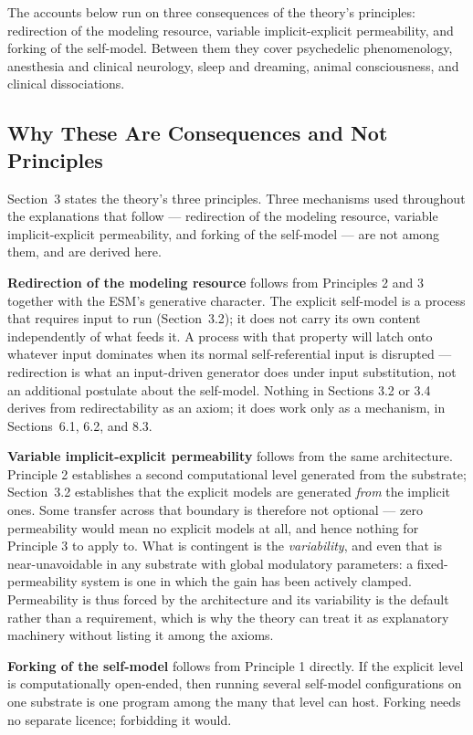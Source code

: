 \documentclass[12pt]{article}
\begin{document}
The accounts below run on three consequences of the theory's principles: redirection of the modeling resource, variable implicit-explicit permeability, and forking of the self-model. Between them they cover psychedelic phenomenology, anesthesia and clinical neurology, sleep and dreaming, animal consciousness, and clinical dissociations.

\subsection*{Why These Are Consequences and Not Principles}

Section~3 states the theory's three principles. Three mechanisms used throughout the explanations that follow --- redirection of the modeling resource, variable implicit-explicit permeability, and forking of the self-model --- are not among them, and are derived here.

\textbf{Redirection of the modeling resource} follows from Principles 2 and 3 together with the ESM's generative character. The explicit self-model is a process that requires input to run (Section~3.2); it does not carry its own content independently of what feeds it. A process with that property will latch onto whatever input dominates when its normal self-referential input is disrupted --- redirection is what an input-driven generator does under input substitution, not an additional postulate about the self-model. Nothing in Sections 3.2 or 3.4 derives from redirectability as an axiom; it does work only as a mechanism, in Sections~6.1, 6.2, and 8.3.

\textbf{Variable implicit-explicit permeability} follows from the same architecture. Principle 2 establishes a second computational level generated from the substrate; Section~3.2 establishes that the explicit models are generated \emph{from} the implicit ones. Some transfer across that boundary is therefore not optional --- zero permeability would mean no explicit models at all, and hence nothing for Principle 3 to apply to. What is contingent is the \emph{variability}, and even that is near-unavoidable in any substrate with global modulatory parameters: a fixed-permeability system is one in which the gain has been actively clamped. Permeability is thus forced by the architecture and its variability is the default rather than a requirement, which is why the theory can treat it as explanatory machinery without listing it among the axioms.

\textbf{Forking of the self-model} follows from Principle 1 directly. If the explicit level is computationally open-ended, then running several self-model configurations on one substrate is one program among the many that level can host. Forking needs no separate licence; forbidding it would.
\end{document}

